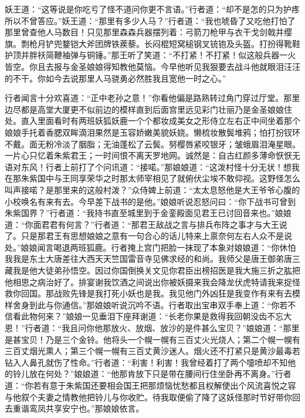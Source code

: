 \documentclass[12pt,UTF8]{ctexbook}
\begin{document}
妖王道：“这等说是你吃亏了怪不道问你更不言语。”行者道：“却不是怎的只为护疼所以不曾答应。”妖王道：“那里有多少人马？”行者道：“我也唬昏了又吃他打怕了那里曾查他人马数目！只见那里森森兵器摆列着：弓箭刀枪甲与衣干戈剑戟并缨旗。剽枪月铲兜鍪铠大斧团牌铁蒺藜。长闷棍短窝槌钢叉铳铇及头盔。打扮得靴鞋护顶并胖袄简鞭袖弹与铜锤。”那王听了笑道：“不打紧！不打紧！似这般兵器一火皆空。你且去报与金圣娘娘得知教他莫恼。今早他听见我狠要去战斗他就眼泪汪汪的不干。你如今去说那里人马骁勇必然胜我且宽他一时之心。”

行者闻言十分欢喜道：“正中老孙之意！”你看他偏是路熟转过角门穿过厅堂。那里边尽都是高堂大厦更不似前边的模样直到后面宫里远见彩门壮丽乃是金圣娘娘住处。直入里面看时有两班妖狐妖鹿一个个都妆成美女之形侍立左右正中间坐着那个娘娘手托着香腮双眸滴泪果然是玉容娇嫩美貌妖娆。懒梳妆散鬓堆鸦；怕打扮钗环不戴。面无粉冷淡了胭脂；无油蓬松了云鬓。努樱唇紧咬银牙；皱蛾眉泪淹星眼。一片心只忆着朱紫君王；一时间恨不离天罗地网。诚然是：自古红颜多薄命恹恹无语对东风！行者上前打了个问讯道：“接喏。”那娘娘道：“这泼村怪十分无状！想我在那朱紫国中与王同享荣华之时那太师宰相见了就俯伏尘埃不敢仰视。这野怪怎么叫声接喏？是那里来的这般村泼？”众侍婢上前道：“太太息怒他是大王爷爷心腹的小校唤名有来有去。今早差下战书的是他。”娘娘听说忍怒问曰：“你下战书可曾到朱紫国界？”行者道：“我持书直至城里到于金銮殿面见君王已讨回音来也。”娘娘道：“你面君君有何言？”行者道：“那君王敌战之言与排兵布阵之事才与大王说了。只是那君王有思想娘娘之意有一句合心的话儿特来上禀奈何左右人众不是说处。”娘娘闻言喝退两班狐鹿。行者掩上宫门把脸一抹现了本象对娘娘道：“你休怕我我是东土大唐差往大西天天竺国雷音寺见佛求经的和尚。我师父是唐王御弟唐三藏我是他大徒弟孙悟空。因过你国倒换关文见你君臣出榜招医是我大施三折之肱把他相思之病治好了。排宴谢我饮酒之间说出你被妖摄来我会降龙伏虎特请我来捉怪救你回国。那战败先锋是我打死小妖也是我。我见他门外凶狂是我变作有来有去模样舍身到此与你通信。”那娘娘听说沉吟不语。行者取出宝串双手奉上道：“你若不信看此物何来？”娘娘一见垂泪下座拜谢道：“长老你果是救得我回朝没齿不忘大恩！”行者道：“我且问你他那放火、放烟、放沙的是件甚么宝贝？”娘娘道：“那里是甚宝贝！乃是三个金铃。他将头一个幌一幌有三百丈火光烧人；第二个幌一幌有三百丈烟光熏人；第三个幌一幌有三百丈黄沙迷人。烟火还不打紧只是黄沙最毒若钻入人鼻孔就伤了性命。”行者道：“利害！利害！我曾经着打了两个嚏喷却不知他的铃儿放在何处？”娘娘道：“他那肯放下只是带在腰间行住坐卧再不离身。”行者道：“你若有意于朱紫国还要相会国王把那烦恼忧愁都且权解使出个风流喜悦之容与他叙个夫妻之情教他把铃儿与你收贮。待我取便偷了降了这妖怪那时节好带你回去重谐鸾凤共享安宁也。”那娘娘依言。
\end{document}
